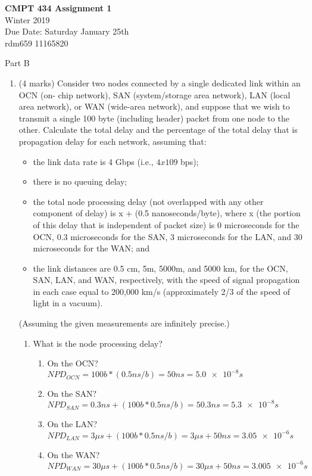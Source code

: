 \documentclass[10pt]{amsart}
\begin{document}
\textbf{CMPT 434 Assignment 1} \\
Winter 2019\\
Due Date: Saturday January 25th\\
rdm659 11165820

Part B

\begin{enumerate}
    \item (4 marks) Consider two nodes connected by a single dedicated link within an OCN (on- chip network), SAN (system/storage area network), LAN (local area network), or WAN (wide-area network), and suppose that we wish to transmit a single 100 byte (including header) packet from one node to the other. Calculate the total delay and the percentage of the total delay that is propagation delay for each network, assuming that:
    \begin{itemize}
        \item the link data rate is 4 Gbps (i.e., $4 x 109$ bps);
        \item there is no queuing delay;
        \item the total node processing delay (not overlapped with any other
            component of delay) is x + (0.5 nanoseconds/byte), where x (the
            portion of this delay that is independent of packet size) is 0
            microseconds for the OCN, 0.3 microseconds for the SAN, 3
            microseconds for the LAN, and 30 microseconds for the WAN; and
        \item the link distances are 0.5 cm, 5m, 5000m, and 5000 km, for the
            OCN, SAN, LAN, and WAN, respectively, with the speed of signal
            propagation in each case equal to 200,000 km/s (approximately 2/3 of
            the speed of light in a vacuum).
    \end{itemize}

    (Assuming the given measurements are infinitely precise.)
    \begin{enumerate}
        \item What is the node processing delay?
        \begin{enumerate}
            \item On the OCN?\\
                $NPD_{OCN} = 100b * (0.5ns/b) = 50ns = \num{5.0e-8}s$
            \item On the SAN?\\
                $NPD_{SAN} = 0.3ns + (100b * 0.5ns/b) = 50.3ns = \num{5.3e-8}s$
            \item On the LAN?\\
                $NPD_{LAN} = 3\mu s + (100b * 0.5ns/b) = 3\mu s + 50ns = \num{3.05e-6}s$
            \item On the WAN?\\
                $NPD_{WAN} = 30\mu s + (100b * 0.5ns/b) = 30\mu s + 50ns = \num{3.005e-6}s$
        \end{enumerate}
        

\end{enumerate}
\end{enumerate}
\end{document}
